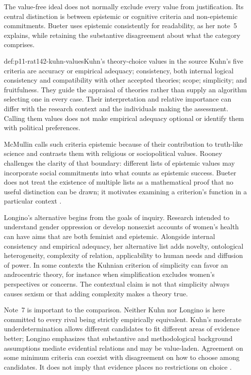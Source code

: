 The value-free ideal does not normally exclude every value from justification.
Its central distinction is between epistemic or cognitive criteria and
non-epistemic commitments. Bueter uses epistemic consistently for readability,
as her note~5 explains, while retaining the substantive disagreement about
what the category comprises.

\begin{hbdefinition}{def:p11-rat142-kuhn-values}{Kuhn's theory-choice values in the source}
Kuhn's five criteria are accuracy or empirical adequacy; consistency,
both internal logical consistency and compatibility with other accepted
theories; scope; simplicity; and fruitfulness. They guide the appraisal
of theories rather than supply an algorithm selecting one in every case.
Their interpretation and relative importance can differ with the research
context and the individuals making the assessment. Calling them values
does not make empirical adequacy optional or identify them with political
preferences.
\end{hbdefinition}

McMullin calls such criteria epistemic because of their contribution to
truth-like science and contrasts them with religious or sociopolitical
values. Rooney challenges the clarity of that boundary: different lists
of epistemic values may incorporate social commitments into what counts
as epistemic success. Bueter does not treat the existence of multiple
lists as a mathematical proof that no useful distinction can be drawn;
it motivates examining a criterion's function in a particular context
\cite[sec.~3, pp.~760--761]{Bueter2021ValueFreedom}.

Longino's alternative begins from the goals of inquiry. Research intended
to understand gender oppression or develop nonsexist accounts of women's
health can have aims that are both feminist and epistemic. Alongside
internal consistency and empirical adequacy, her alternative list adds
novelty, ontological heterogeneity, complexity of relation, applicability
to human needs and diffusion of power. In some contexts the Kuhnian
criterion of simplicity can favor an androcentric theory, for instance
when simplification excludes women's perspectives or concerns.
The contextual claim is not that simplicity always causes sexism or
that adding complexity makes a theory true.

Note~7 is important to the comparison. Neither Kuhn nor Longino is here
committed to every rival being strictly empirically equivalent. Kuhn's
moderate underdetermination allows different candidates to fit different
areas of evidence better; Longino emphasizes that substantive and
methodological background assumptions mediate evidential relations and
may be value-laden. Agreement on some minimum criteria can coexist with
disagreement on how to choose among candidates. It does not imply that
evidence places no restrictions on choice
\cite[pp.~760,763, notes~6--7]{Bueter2021ValueFreedom}.

